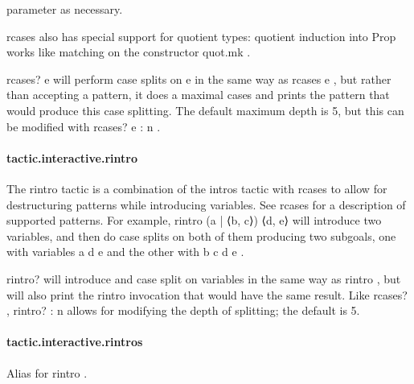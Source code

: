 \documentclass{article}
\begin{document}
parameter as necessary.
\par
\colorbox[RGB]{253,246,227}{{{{\color[RGB]{101, 123, 131} rcases }}}} also has special support for quotient types: quotient induction into Prop works like
matching on the constructor 
\colorbox[RGB]{253,246,227}{{{{\color[RGB]{101, 123, 131} quot.mk }}}}.
\par
\colorbox[RGB]{253,246,227}{{{{\color[RGB]{101, 123, 131} rcases? e }}}} will perform case splits on 
\colorbox[RGB]{253,246,227}{{{{\color[RGB]{101, 123, 131} e }}}} in the same way as 
\colorbox[RGB]{253,246,227}{{{{\color[RGB]{101, 123, 131} rcases e }}}},
but rather than accepting a pattern, it does a maximal cases and prints the
pattern that would produce this case splitting. The default maximum depth is 5,
but this can be modified with 
\colorbox[RGB]{253,246,227}{{{{\color[RGB]{101, 123, 131} rcases? e : n }}}}.
\paragraph{tactic.interactive.rintro}
\par
The 
\colorbox[RGB]{253,246,227}{{{{\color[RGB]{101, 123, 131} rintro }}}} tactic is a combination of the 
\colorbox[RGB]{253,246,227}{{{{\color[RGB]{101, 123, 131} intros }}}} tactic with 
\colorbox[RGB]{253,246,227}{{{{\color[RGB]{101, 123, 131} rcases }}}} to
allow for destructuring patterns while introducing variables. See 
\colorbox[RGB]{253,246,227}{{{{\color[RGB]{101, 123, 131} rcases }}}} for
a description of supported patterns. For example, 
\colorbox[RGB]{253,246,227}{{{{\color[RGB]{101, 123, 131} rintro (a | ⟨b, c⟩) ⟨d, e⟩ }}}}will introduce two variables, and then do case splits on both of them producing
two subgoals, one with variables 
\colorbox[RGB]{253,246,227}{{{{\color[RGB]{101, 123, 131} a d e }}}} and the other with 
\colorbox[RGB]{253,246,227}{{{{\color[RGB]{101, 123, 131} b c d e }}}}.
\par
\colorbox[RGB]{253,246,227}{{{{\color[RGB]{101, 123, 131} rintro? }}}} will introduce and case split on variables in the same way as
\colorbox[RGB]{253,246,227}{{{{\color[RGB]{101, 123, 131} rintro }}}}, but will also print the 
\colorbox[RGB]{253,246,227}{{{{\color[RGB]{101, 123, 131} rintro }}}} invocation that would have the same
result. Like 
\colorbox[RGB]{253,246,227}{{{{\color[RGB]{101, 123, 131} rcases? }}}}, 
\colorbox[RGB]{253,246,227}{{{{\color[RGB]{101, 123, 131} rintro? : n }}}} allows for modifying the
depth of splitting; the default is 5.
\paragraph{tactic.interactive.rintros}
\par
Alias for 
\colorbox[RGB]{253,246,227}{{{{\color[RGB]{101, 123, 131} rintro }}}}.
\end{document}
